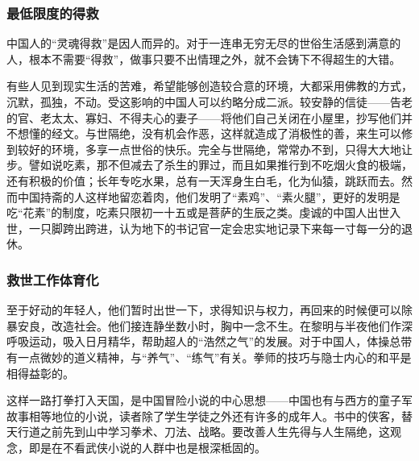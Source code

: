 \subsubsection*{最低限度的得救}
\par 中国人的“灵魂得救”是因人而异的。对于一连串无穷无尽的世俗生活感到满意的人，根本不需要“得救”，做事只要不出情理之外，就不会铸下不得超生的大错。
\par 有些人见到现实生活的苦难，希望能够创造较合意的环境，大都采用佛教的方式，沉默，孤独，不动。受这影响的中国人可以约略分成二派。较安静的信徒——告老的官、老太太、寡妇、不得夫心的妻子——将他们自己关闭在小屋里，抄写他们并不想懂的经文。与世隔绝，没有机会作恶，这样就造成了消极性的善，来生可以修到较好的环境，多享一点世俗的快乐。完全与世隔绝，常常办不到，只得大大地让步。譬如说吃素，那不但减去了杀生的罪过，而且如果推行到不吃烟火食的极端，还有积极的价值；长年专吃水果，总有一天浑身生白毛，化为仙猿，跳跃而去。然而中国持斋的人这样地留恋着肉，他们发明了“素鸡”、“素火腿”，更好的发明是吃“花素”的制度，吃素只限初一十五或是菩萨的生辰之类。虔诚的中国人出世入世，一只脚跨出跨进，认为地下的书记官一定会忠实地记录下来每一寸每一分的退休。
\subsubsection*{救世工作体育化}
\par 至于好动的年轻人，他们暂时出世一下，求得知识与权力，再回来的时候便可以除暴安良，改造社会。他们接连静坐数小时，胸中一念不生。在黎明与半夜他们作深呼吸运动，吸入日月精华，帮助超人的“浩然之气”的发展。对于中国人，体操总带有一点微妙的道义精神，与“养气”、“练气”有关。拳师的技巧与隐士内心的和平是相得益彰的。
\par 这样一路打拳打入天国，是中国冒险小说的中心思想——中国也有与西方的童子军故事相等地位的小说，读者除了学生学徒之外还有许多的成年人。书中的侠客，替天行道之前先到山中学习拳术、刀法、战略。要改善人生先得与人生隔绝，这观念，即是在不看武侠小说的人群中也是根深柢固的。
